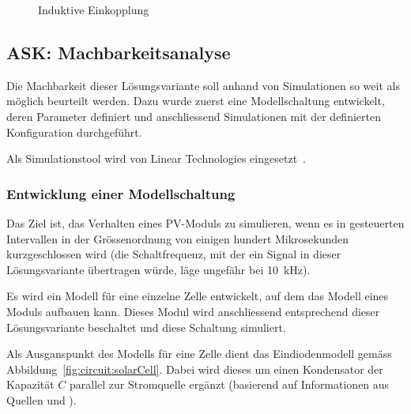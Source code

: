 \begin{figure}[h!tb]
    \centering
    
    \caption{Induktive Einkopplung}
    \label{fig:circ:coupling:inductive}
\end{figure}


\subsection{ASK: Machbarkeitsanalyse}
\label{subsec:hw:ask:machbarkeit}

Die Machbarkeit dieser L\"osungsvariante soll anhand von Simulationen so weit als
m\"oglich beurteilt werden.
Dazu  wurde  zuerst  eine  Modellschaltung  entwickelt,  deren
Parameter  definiert  und  anschliessend   Simulationen  mit  der  definierten
Konfiguration durchgef\"uhrt.

Als   Simulationstool  wird      von  Linear   Technologies
eingesetzt~\cite{ref:ltspice}.


\subsubsection{Entwicklung einer Modellschaltung}
\label{subsubsec:hw:ask:modell}

Das  Ziel  ist,   das  Verhalten  eines  PV-Moduls  zu   simulieren,  wenn  es
in  gesteuerten  Intervallen  in  der  Gr\"ossenordnung  von  einigen  hundert
Mikrosekunden  kurzgeschlossen wird  (die Schaltfrequenz,  mit der  ein Signal
in  dieser  L\"osungsvariante  \"ubertragen  w\"urde,  l\"age  ungef\"ahr  bei
\SI{10}{\kilo\hertz}).

Es wird  ein Modell f\"ur eine  einzelne Zelle entwickelt, auf  dem das Modell
eines  Moduls  aufbauen  kann. Dieses Modul  wird  anschliessend  entsprechend
dieser L\"osungsvariante beschaltet und diese Schaltung simuliert.

Als    Ausganspunkt    des    Modells    f\"ur   eine    Zelle    dient    das
Eindiodenmodell          gem\"ass
Abbildung~\ref{fig:circuit:solarCell}. Dabei    wird     dieses    um    einen
Kondensator   der  Kapazit\"at   $C$   parallel   zur  Stromquelle   erg\"anzt
(basierend  auf   Informationen  aus  Quellen   \cite{ref:solar:scofield}  und
\cite{ref:solar:friesen}).

